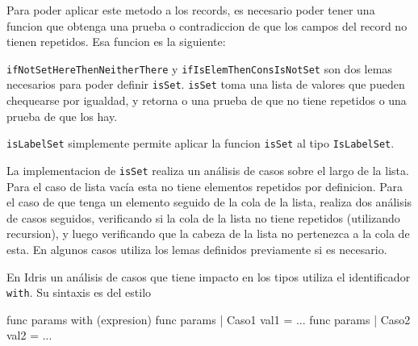 Para poder aplicar este metodo a los records, es necesario poder tener una funcion que obtenga una prueba o contradiccion de que los campos del record no tienen repetidos. Esa funcion es la siguiente:


\texttt{ifNotSetHereThenNeitherThere} y \texttt{ifIsElemThenConsIsNotSet} son dos lemas necesarios para poder definir \texttt{isSet}. \texttt{isSet} toma una lista de valores que pueden chequearse por igualdad, y retorna o una prueba de que no tiene repetidos o una prueba de que los hay.

\texttt{isLabelSet} simplemente permite aplicar la funcion \texttt{isSet} al tipo \texttt{IsLabelSet}.

La implementacion de \texttt{isSet} realiza un análisis de casos sobre el largo de la lista. Para el caso de lista vacía esta no tiene elementos repetidos por definicion. Para el caso de que tenga un elemento seguido de la cola de la lista, realiza dos análisis de casos seguidos, verificando si la cola de la lista no tiene repetidos (utilizando recursion), y luego verificando que la cabeza de la lista no pertenezca a la cola de esta. En algunos casos utiliza los lemas definidos previamente si es necesario.

En Idris un análisis de casos que tiene impacto en los tipos utiliza el identificador \texttt{with}. Su sintaxis es del estilo

\begin{code}
func params with (expresion)
  func params | Caso1 val1 = ...
  func params | Caso2 val2 = ...
\end{code}

